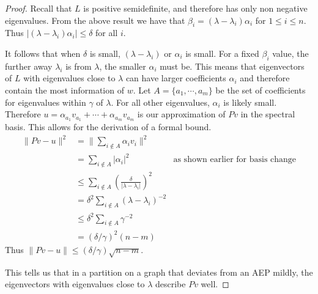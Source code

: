\documentclass[10pt,a4paper]{amsart}
\begin{document}
\begin{proof}
    Recall that $L$ is positive semidefinite, and therefore has only non negative eigenvalues. From the above result we have that $\beta_i=(\lambda-\lambda_i)\alpha_i$ for $1\leq i\leq n$. Thus $|(\lambda-\lambda_i)\alpha_i| \leq \delta$ for all $i$.
    
    It follows that when $\delta$ is small, $(\lambda-\lambda_i)$ or $\alpha_i$ is small. For a fixed $\beta_i$ value, the further away $\lambda_i$ is from $\lambda$, the smaller $\alpha_i$ must be. This means that eigenvectors of $L$ with eigenvalues close to $\lambda$ can have larger coefficients $\alpha_i$ and therefore contain the most information of $w$. Let $A=\{a_1,\cdots,a_m\}$ be the set of coefficients for eigenvalues within $\gamma$ of $\lambda$. For all other eigenvalues, $\alpha_i$ is likely small. Therefore $u= \alpha_{a_1}v_{a_1}+\cdots+\alpha_{a_m}v_{a_m}$ is our approximation of $Pv$ in the spectral basis. This allows for the derivation of a formal bound.
    \begin{align*}
        \|Pv - u\|^2 &= \|\sum_{i\not\in A} \alpha_i v_i\|^2\\
        &= \sum_{i\not\in A} |\alpha_i|^2    &\text{as shown earlier for basis change}\\
        &\leq \sum_{i\not\in A} \left(\frac{\delta}{|\lambda-\lambda_i|}\right)^2\\
        &= \delta^2 \sum_{i\not\in A} \left(\lambda-\lambda_i\right)^{-2}\\
        &\leq \delta^2 \sum_{i\not\in A} \gamma^{-2}\\
        &= (\delta/\gamma)^{2} (n-m) 
    \end{align*}
    Thus $\|Pv-u\| \leq (\delta/\gamma) \sqrt{n-m}$.

    
    This tells us that in a partition on a graph that deviates from an AEP mildly, the eigenvectors with eigenvalues close to $\lambda$ describe $Pv$ well.
\end{proof}
\end{document}
